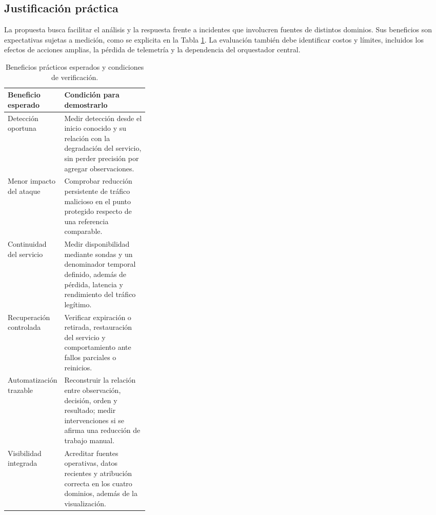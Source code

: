\subsection{Justificación práctica}

La propuesta busca facilitar el análisis y la respuesta frente a incidentes que involucren fuentes de distintos dominios. Sus beneficios son expectativas sujetas a medición, como se explicita en la Tabla \ref{tab:beneficios_practicos}. La evaluación también debe identificar costos y límites, incluidos los efectos de acciones amplias, la pérdida de telemetría y la dependencia del orquestador central.

\begin{table}[H]
    \centering
    \renewcommand{\arraystretch}{1.25}
    \fontsize{10}{12}\selectfont
    \begin{tabular}{@{}>{\raggedright\arraybackslash}p{0.32\linewidth}
        >{\raggedright\arraybackslash}p{}@{}}
        \hline \textbf{Beneficio esperado} & \textbf{Condición para demostrarlo} \\ \hline
        Detección oportuna & Medir detección desde el inicio conocido y su relación con la degradación del servicio, sin perder precisión por agregar observaciones. \\ \hline
        Menor impacto del ataque & Comprobar reducción persistente de tráfico malicioso en el punto protegido respecto de una referencia comparable. \\ \hline
        Continuidad del servicio & Medir disponibilidad mediante sondas y un denominador temporal definido, además de pérdida, latencia y rendimiento del tráfico legítimo. \\ \hline
        Recuperación controlada & Verificar expiración o retirada, restauración del servicio y comportamiento ante fallos parciales o reinicios. \\ \hline
        Automatización trazable & Reconstruir la relación entre observación, decisión, orden y resultado; medir intervenciones si se afirma una reducción de trabajo manual. \\ \hline
        Visibilidad integrada & Acreditar fuentes operativas, datos recientes y atribución correcta en los cuatro dominios, además de la visualización. \\ \hline
    \end{tabular}
    \caption{Beneficios prácticos esperados y condiciones de verificación.}
    \label{tab:beneficios_practicos}
\end{table}

